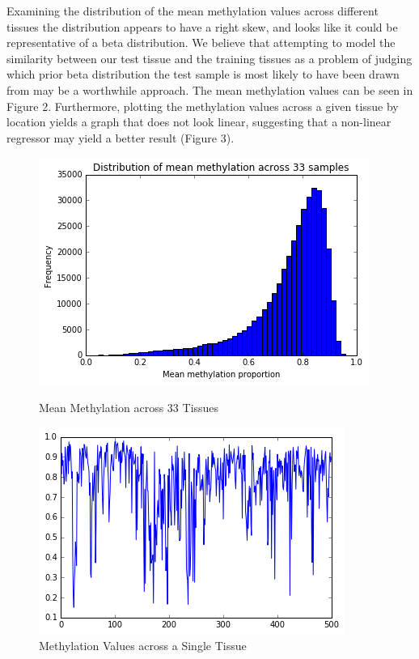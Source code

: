 \documentclass{article} %
\begin{document}
Examining the distribution of the mean methylation values across different tissues the distribution appears to have a right skew, and looks like it could be representative of a beta distribution. We believe that attempting to model the similarity between our test tissue and the training tissues as a problem of judging which prior beta distribution the test sample is most likely to have been drawn from may be a worthwhile approach. The mean methylation values can be seen in Figure 2. Furthermore, plotting the methylation values across a given tissue by location yields a graph that does not look linear, suggesting that a non-linear regressor may yield a better result (Figure 3).

\begin{figure}[!ht]
\begin{minipage}[b]{0.50\linewidth}
\begin{center}
	\includegraphics[scale=0.4]{MeanMethylations.png}
	\caption{Mean Methylation across 33 Tissues}
\end{center}
\end{minipage}
\begin{minipage}[b]{0.50\linewidth}
\begin{center}
	\includegraphics[scale=0.4]{GraphMethylationValues.png}
	\caption{Methylation Values across a Single Tissue}
\end{center}
\end{minipage}
\end{figure}
\end{document}
